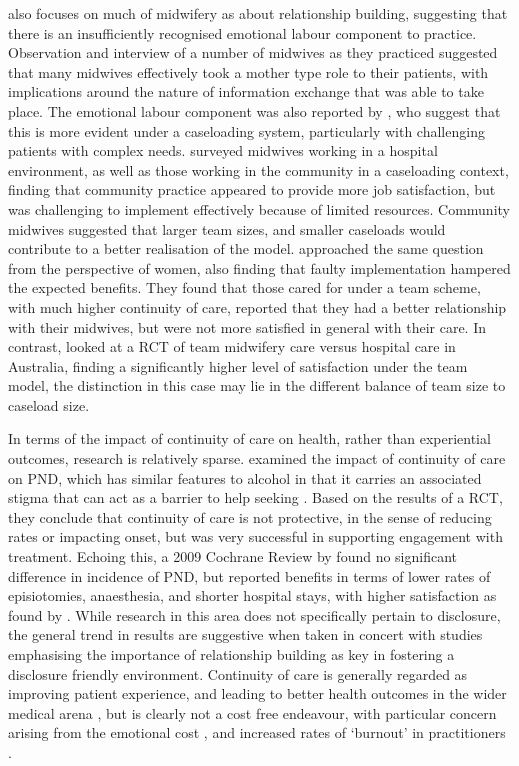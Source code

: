 \citet{Hunter2006} also focuses on much of midwifery as about relationship
building, suggesting that there is an insufficiently recognised emotional
labour component to practice. Observation and interview of a number
of midwives as they practiced suggested that many midwives effectively
took a mother type role to their patients, with implications around
the nature of information exchange that was able to take place. The
emotional labour component was also reported by \citeauthor{Stevens2002},
who suggest that this is more evident under a caseloading system, particularly
with challenging patients with complex needs. \citet{Todd1998} surveyed
midwives working in a hospital environment, as well as those working
in the community in a caseloading context, finding that community
practice appeared to provide more job satisfaction, but was challenging
to implement effectively because of limited resources. Community midwives
suggested that larger team sizes, and smaller caseloads would contribute
to a better realisation of the model. \citet{Farquhar2000} approached
the same question from the perspective of women, also finding that
faulty implementation hampered the expected benefits. They found that
those cared for under a team scheme, with much higher continuity of
care, reported that they had a better relationship with their midwives,
but were not more satisfied in general with their care. In contrast,
\citet{Biro2003} looked at a \ac{RCT} of team midwifery care versus
hospital care in Australia, finding a significantly higher level of
satisfaction under the team model, the distinction in this case may
lie in the different balance of team size to caseload size.

In terms of the impact of continuity of care on health, rather than
experiential outcomes, research is relatively sparse. \citet{Marks2003}
examined the impact of continuity of care on \ac{PND}, which has
similar features to alcohol in that it carries an associated stigma
that can act as a barrier to help seeking \citep{Dennis2006}. Based
on the results of a \ac{RCT}, they conclude that continuity of care
is not protective, in the sense of reducing rates or impacting onset,
but was very successful in supporting engagement with treatment. Echoing
this, a 2009 Cochrane Review by \citet{Hatem2009} found no significant
difference in incidence of \ac{PND}, but reported benefits in terms
of lower rates of \gls{episiotomies}, anaesthesia, and shorter hospital
stays, with higher satisfaction as found by \citeauthor{Biro2003}.
While research in this area does not specifically pertain to disclosure,
the general trend in results are suggestive when taken in concert
with studies emphasising the importance of relationship building as
key in fostering a disclosure friendly environment. Continuity of
care is generally regarded as improving patient experience, and leading
to better health outcomes in the wider medical arena \citep{VanWalraven2010},
but is clearly not a cost free endeavour, with particular concern
arising from the emotional cost \citep{Todd1998}, and increased rates
of `\gls{burnout}' in practitioners \citep{Sandall1997}.


